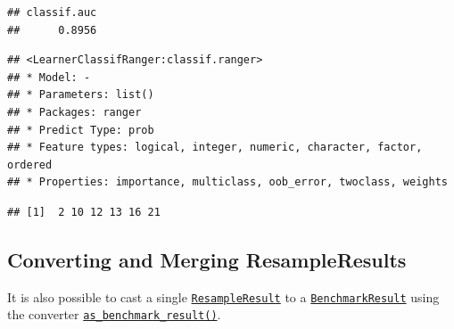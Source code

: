 \documentclass[]{scrbook}
\newenvironment{Shaded}{\begin{snugshade}}{\end{snugshade}}
\newcommand{\CommentTok}[1]{\textcolor[rgb]{0.56,0.35,0.01}{\textit{#1}}}
\newcommand{\KeywordTok}[1]{\textcolor[rgb]{0.13,0.29,0.53}{\textbf{#1}}}
\newcommand{\NormalTok}[1]{#1}
\newcommand{\OperatorTok}[1]{\textcolor[rgb]{0.81,0.36,0.00}{\textbf{#1}}}
\newcommand{\StringTok}[1]{\textcolor[rgb]{0.31,0.60,0.02}{#1}}
\renewenvironment{Shaded} {\begin{snugshade}\small} {\end{snugshade}}
\begin{document}
\begin{verbatim}
## classif.auc 
##      0.8956
\end{verbatim}

\begin{Shaded}
\end{Shaded}

\begin{verbatim}
## <LearnerClassifRanger:classif.ranger>
## * Model: -
## * Parameters: list()
## * Packages: ranger
## * Predict Type: prob
## * Feature types: logical, integer, numeric, character, factor, ordered
## * Properties: importance, multiclass, oob_error, twoclass, weights
\end{verbatim}

\begin{Shaded}
\end{Shaded}

\begin{verbatim}
## [1]  2 10 12 13 16 21
\end{verbatim}

\hypertarget{converting-and-merging-resampleresults}{%
\subsection{Converting and Merging ResampleResults}\label{converting-and-merging-resampleresults}}

It is also possible to cast a single \href{https://mlr3.mlr-org.com/reference/ResampleResult.html}{\texttt{ResampleResult}} to a \href{https://mlr3.mlr-org.com/reference/BenchmarkResult.html}{\texttt{BenchmarkResult}} using the converter \href{https://mlr3.mlr-org.com/reference/as_benchmark_result.html}{\texttt{as\_benchmark\_result()}}.
\end{document}

